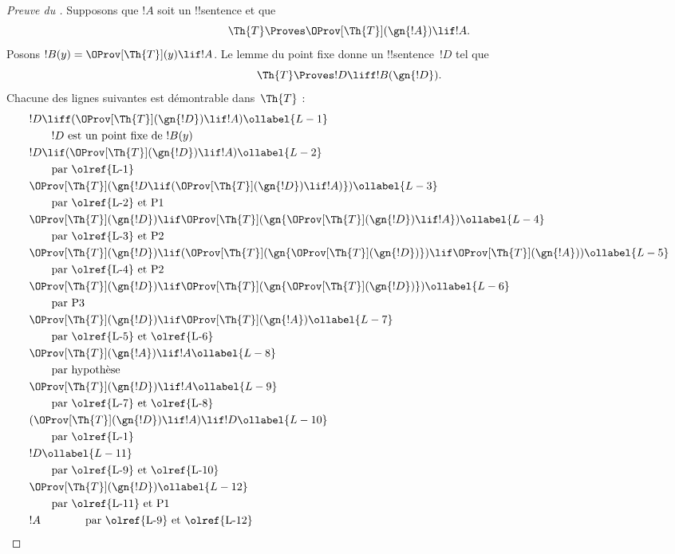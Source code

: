 \documentclass[../../../include/open-logic-section]{subfiles}
\begin{document}
\begin{proof}[Preuve du ]
Supposons que $!A$ soit un !!{sentence} et que
\[
\Th{T}\Proves\OProv[\Th{T}](\gn{!A})\lif !A.
\]
Posons $!B(y)=\OProv[\Th{T}](y)\lif !A$.
Le lemme du point fixe donne un !!{sentence}~$!D$
tel que
\[
\Th{T}\Proves !D\liff !B(\gn{!D}).
\]
Chacune des lignes suivantes est démontrable
dans~$\Th{T}$ :
\begin{align}
  & !D \liff (\OProv[\Th{T}](\gn{!D}) \lif !A) \ollabel{L-1}\\
  & \qquad \text{$!D$ est un point fixe de~$!B(y)$}\notag \\
  & !D \lif (\OProv[\Th{T}](\gn{!D}) \lif !A) \ollabel{L-2}\\
  & \qquad\text{par \olref{L-1}}\notag\\
  & \OProv[\Th{T}](\gn{!D \lif (\OProv[\Th{T}](\gn{!D}) \lif !A)}) \ollabel{L-3}\\
  & \qquad\text{par \olref{L-2} et P1}\notag \\
  & \OProv[\Th{T}](\gn{!D}) \lif \OProv[\Th{T}](\gn{\OProv[\Th{T}](\gn{!D}) \lif !A})
  \ollabel{L-4}\\
  &\qquad \text{par \olref{L-3} et P2}\notag \\
  & \OProv[\Th{T}](\gn{!D}) \lif (\OProv[\Th{T}](\gn{\OProv[\Th{T}](\gn{!D})}) \lif \OProv[\Th{T}](\gn{!A})) \ollabel{L-5}\\
  &\qquad \text{par \olref{L-4} et P2}\notag\\
  & \OProv[\Th{T}](\gn{!D}) \lif \OProv[\Th{T}](\gn{\OProv[\Th{T}](\gn{!D})}) \ollabel{L-6}\\
  & \qquad\text{par P3}\notag\\
  & \OProv[\Th{T}](\gn{!D}) \lif \OProv[\Th{T}](\gn{!A}) \ollabel{L-7}\\
  &\qquad\text{par \olref{L-5} et \olref{L-6}}\notag\\
  & \OProv[\Th{T}](\gn{!A}) \lif !A \ollabel{L-8}\\
  &\qquad\text{par hypothèse}\notag\\
  & \OProv[\Th{T}](\gn{!D}) \lif !A \ollabel{L-9}\\
  &\qquad\text{par \olref{L-7} et \olref{L-8}}\notag\\
  & (\OProv[\Th{T}](\gn{!D}) \lif !A) \lif !D \ollabel{L-10}\\
  & \qquad \text{par \olref{L-1}}\notag \\
  & !D \ollabel{L-11}\\
  & \qquad\text{par \olref{L-9} et \olref{L-10}}\notag \\
  & \OProv[\Th{T}](\gn{!D}) \ollabel{L-12}\\
  & \qquad\text{par \olref{L-11} et P1}\notag \\
  & !A \qquad\qquad\text{par \olref{L-9} et \olref{L-12}}\notag
\end{align}
\end{proof}
\end{document}
